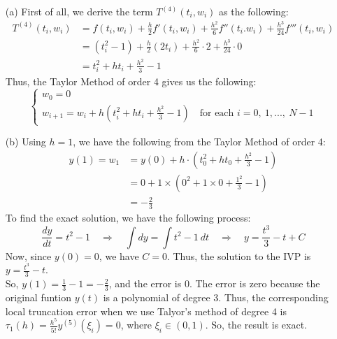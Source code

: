 \documentclass[11pt]{article}
\begin{document}
\begin{itemize}
	\item [(a)]
	First of all, we derive the term $ T^{(4)}(t_i,w_i) $ as the following:
	\begin{equation*}
	\begin{aligned}
	T^{(4)}(t_i, w_i) &= f(t_i,w_i) + \frac{h}{2}f'(t_i,w_i) + \frac{h^2}{6}f''(t_i.w_i) + \frac{h^3}{24}f'''(t_i,w_i)\\
	&=(t_i^2 - 1) + \frac{h}{2}(2t_i) + \frac{h^2}{6}\cdot 2 + \frac{h^3}{24}\cdot 0\\
	&=t_i^2 + ht_i + \frac{h^2}{3} - 1
	\end{aligned}
	\end{equation*}
	Thus, the Taylor Method of order 4 gives us the following:
	\[\begin{cases}
	w_0 = 0\\
	w_{i+1} = w_i + h(t_i^2 + ht_i + \frac{h^2}{3} - 1)\quad \text{for each } i = 0,\ 1,...,\ N-1
	\end{cases} \]
	\item [(b)]
	Using $ h = 1 $, we have the following from the Taylor Method of order 4:
	\begin{equation*}
	\begin{aligned}
	y(1) = w_1 &= y(0) + h\cdot(t_0^2 + ht_0 + \frac{h^2}{3} - 1)\\
	&= 0 + 1\times(0^2 + 1\times0 + \frac{1^2}{3} - 1)\\
	&= \boxed{-\frac{2}{3}}
	\end{aligned}
	\end{equation*}
	To find the exact solution, we have the following process:
	\[ \frac{dy}{dt} = t^2 - 1 \quad\Longrightarrow\quad \int dy = \int t^2 - 1\ dt \quad \Longrightarrow\quad y = \frac{t^3}{3} -t + C\]
	Now, since $ y(0) = 0 $, we have $ C= 0  $. Thus, the solution to the IVP is $ \displaystyle\boxed{y = \frac{t^3}{3} -t}$. \\
	So, $ \displaystyle y(1) = \frac{1}{3} - 1 = \boxed{-\frac{2}{3}} $, and the error is $ 0 $. The error is zero because the original funtion $ y(t) $ is a polynomial of degree $ 3 $. Thus, the corresponding local truncation error when we use Talyor's method of degree 4 is $\displaystyle \tau_1(h) =  \frac{h^5}{5!}y^{(5)}(\xi_i) = 0 $, where $ \xi_i\in (0,1) $. So, the result is exact. \pagebreak
\end{itemize}
\end{document}
